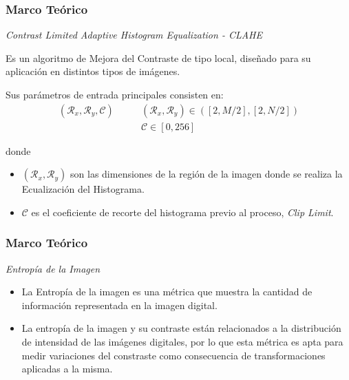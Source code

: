 \documentclass[usenames,dvipsnames]{beamer}
\begin{document}
\begin{frame} 
\frametitle{Marco Teórico} 
\begin{exampleblock}{\textit{Contrast Limited Adaptive Histogram Equalization - CLAHE}}

Es un algoritmo de Mejora del Contraste de tipo local, diseñado para su aplicación en distintos tipos de imágenes. 

Sus parámetros de entrada principales consisten en:
\begin{equation}
\begin{split}
(\mathscr{R}_x, \mathscr{R}_y, \mathscr{C}) & \qquad (\mathscr{R}_x, \mathscr{R}_y) \in ([2,M/2],[2,N/2]) \\
											& \qquad \mathscr{C} \in [0,256]
\end{split}
\end{equation}


donde
\end{exampleblock}
\centering

\begin{itemize}
	\item $(\mathscr{R}_x, \mathscr{R}_y)$ son las dimensiones de la región de la imagen donde se realiza la Ecualización del Histograma.
	\item $\mathscr{C}$ es el coeficiente de recorte del histograma previo al proceso, \textit{Clip Limit}. 
\end{itemize}


\end{frame}

\begin{frame} 
\frametitle{Marco Teórico} 
\begin{exampleblock}{\textit{Entropía de la Imagen}}
\begin{itemize}

\item La Entropía de la imagen es una métrica que muestra la cantidad de información representada en la imagen digital.

\item La entropía de la imagen y su contraste están relacionados a la distribución de intensidad de las imágenes digitales, por lo que esta métrica es apta para medir variaciones del constraste como consecuencia de transformaciones aplicadas a la misma.

\end{itemize}

\end{exampleblock}

\centering

\end{frame}
\end{document}
